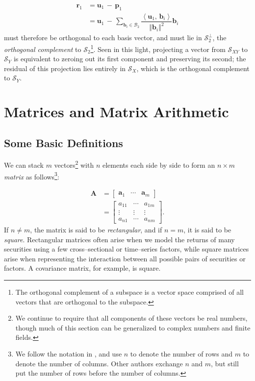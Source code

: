 \documentclass[graybox,envcountchap,sectrefs]{svmono}\usepackage[]{graphicx}\usepackage[]{xcolor}
\begin{document}
\begin{appendices}
\begin{align}
\mathbf{r}_{1} & =\mathbf{u}_{1}\,-\,\mathbf{p}_{1}\nonumber \\
 & =\mathbf{u}_{1}\,-\,\sum_{\mathrm{\mathbf{b}}_{i}\in\mathcal{{B}}_{2}}\dfrac{\left\langle \mathrm{\mathbf{u}}_{1},\,\mathrm{\mathbf{b}}_{i}\right\rangle }{\left\Vert \mathrm{\mathbf{b}}_{i}\right\Vert ^{2}}\mathrm{\mathbf{b}}_{i}\label{eq:ProjectionResidual}
\end{align}
must therefore be orthogonal to each basis vector, and must lie in
$\mathcal{{S}}_{2}^{\bot}$, the \emph{orthogonal complement} to $\mathcal{{S}}_{2}$\footnote{The orthogonal complement of a subspace is a vector space comprised
of all vectors that are orthogonal to the subspace.}. Seen in this light, projecting a vector from $\mathcal{{S}}_{XY}$
to $\mathcal{{S}}_{Y}$ is equivalent to zeroing out its first component
and preserving its second; the residual of this projection lies entirely
in $\mathcal{{S}}_{X}$, which is the orthogonal complement to $\mathcal{{S}}_{Y}$. 

\section{Matrices and Matrix Arithmetic}

\subsection{Some Basic Definitions}

We can stack $m$ vectors\footnote{We continue to require that all components of these vectors be real
numbers, though much of this section can be generalized to complex
numbers and finite fields.} with $n$ elements each side by side to form an $n\times m$ \emph{matrix}
as follows\footnote{We follow the notation in \citet{Gentle2017}, and use $n$ to denote
the number of rows and $m$ to denote the number of columns. Other
authors exchange $n$ and $m$, but still put the number of rows before
the number of columns.}:

\begin{align}
\mathrm{\mathbf{A}} & =\left[\begin{array}{ccc}
\mathrm{\mathbf{a}}_{1} & \cdots & \mathrm{\mathbf{a}}_{m}\end{array}\right]\nonumber \\
 & =\left[\begin{array}{ccc}
a_{11} & \cdots & a_{1m}\\[0.5em]
\vdots & \vdots & \vdots\\
a_{n1} & \cdots & a_{nm}
\end{array}\right].\label{eq:Matrix}
\end{align}
If $n\neq m$, the matrix is said to be \emph{rectangular}, and if
$n=m$, it is said to be \emph{square}. Rectangular matrices often
arise when we model the returns of many securities using a few cross--sectional
or time--series factors, while square matrices arise when representing
the interaction between all possible pairs of securities or factors.
A covariance matrix, for example, is square.


\end{appendices}
\end{document}
